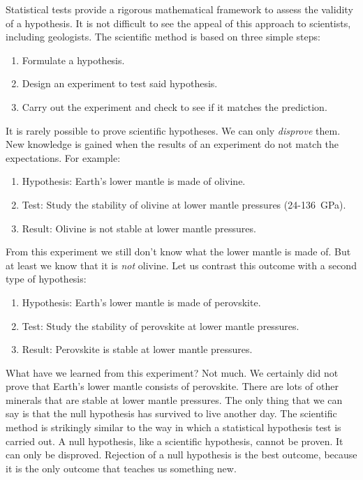 Statistical tests provide a rigorous mathematical framework to assess
the validity of a hypothesis. It is not difficult to see the appeal of
this approach to scientists, including geologists. The scientific
method is based on three simple steps:

\begin{enumerate}
\item Formulate a hypothesis.
\item Design an experiment to test said hypothesis.
\item Carry out the experiment and check to see if it matches the prediction.
\end{enumerate}

It is rarely possible to prove scientific hypotheses. We can only
\emph{disprove} them. New knowledge is gained when the results of an
experiment do not match the expectations. For example:

\begin{enumerate}
\item Hypothesis: Earth's lower mantle is made of olivine.
\item Test: Study the stability of olivine at lower mantle pressures
  (24-136~GPa).
\item Result: Olivine is not stable at lower mantle pressures.
\end{enumerate}

From this experiment we still don't know what the lower mantle is made
of.  But at least we know that it is \emph{not} olivine. Let us
contrast this outcome with a second type of hypothesis:

\begin{enumerate}
\item Hypothesis: Earth's lower mantle is made of perovskite.
\item Test: Study the stability of perovskite at lower mantle
  pressures.
\item Result: Perovskite is stable at lower mantle pressures.
\end{enumerate}

What have we learned from this experiment? Not much. We certainly did
not prove that Earth's lower mantle consists of perovskite. There are
lots of other minerals that are stable at lower mantle pressures. The
only thing that we can say is that the null hypothesis has survived to
live another day. The scientific method is strikingly similar to the
way in which a statistical hypothesis test is carried out. A null
hypothesis, like a scientific hypothesis, cannot be proven. It can
only be disproved. Rejection of a null hypothesis is the best outcome,
because it is the only outcome that teaches us something new.\medskip

